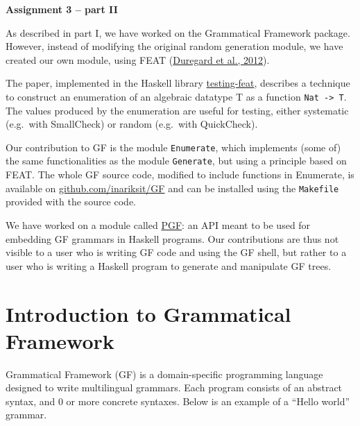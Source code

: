 \documentclass[]{article}
\author{}
\date{}
\begin{document}
\pagestyle{fancy}
\lhead{\textcolor{gray}{Simon Robillard \& Inari Listenmaa}}
\rhead{\textcolor{gray}{Advanced Functional Programming}}
\lfoot{\textcolor{gray}{}}
\rfoot{\thepage}
\renewcommand{\headrulewidth}{0.5pt} 
\renewcommand{\footrulewidth}{0.5pt} 
\fancyfoot[C]{\footnotesize \textcolor{gray}{}} 

\centerline{ {\Large \bf Assignment 3 -- part II} }
\vspace*{0.2cm}

As described in part I, we have worked on the Grammatical Framework
package. However, instead of modifying the original random generation
module, we have created our own module, using FEAT
(\href{http://dl.acm.org/citation.cfm?id=2364515}{Duregard et al.,
2012}).

The paper, implemented in the Haskell library
\href{http://hackage.haskell.org/package/testing-feat}{testing-feat},
describes a technique to construct an enumeration of an algebraic
datatype T as a function \texttt{Nat -\textgreater{} T}. The values
produced by the enumeration are useful for testing, either systematic
(e.g.~with SmallCheck) or random (e.g.~with QuickCheck).

Our contribution to GF is the module \texttt{Enumerate}, which
implements (some of) the same functionalities as the module
\texttt{Generate}, but using a principle based on FEAT. The whole GF
source code, modified to include functions in Enumerate, is available on
\href{https://github.com/inariksit/GF}{github.com/inariksit/GF} and can
be installed using the \texttt{Makefile} provided with the source code.

We have worked on a module called
\href{http://hackage.haskell.org/package/gf-3.6/docs/PGF.html}{PGF}: an
API meant to be used for embedding GF grammars in Haskell programs. 
Our contributions are thus not visible to a user who is writing GF code 
and using the GF shell, but rather to a user who is writing a Haskell 
program to generate and manipulate GF trees.

\section{Introduction to Grammatical
Framework}\label{introduction-to-grammatical-framework}

Grammatical Framework (GF) is a domain-specific programming language
designed to write multilingual grammars. Each program consists of an
abstract syntax, and 0 or more concrete syntaxes. Below is an example of
a ``Hello world'' grammar.
\end{document}
